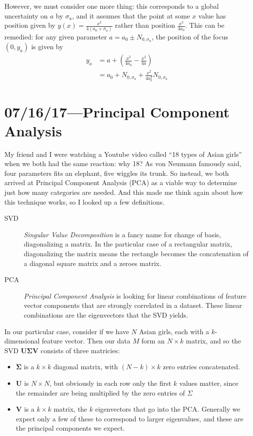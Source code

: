 \documentclass[12pt]{report}
\newcommand{\bm}[1]{\boldsymbol{\mathbf{#1}}}
\begin{document}
However, we must consider one more thing: this corresponds to a global
uncertainty on $a$ by $\sigma_a$, and it assumes that the point at some $x$
value has position given by $y(x) = \frac{x^2}{4 (a_0 + \sigma_a)}$ rather than
position $\frac{x^2}{4 a_0}$. This can be remedied: for any given parameter $a =
a_0 \pm N_{0, \sigma_a}$, the position of the focus $(0, y_a)$ is given by
\begin{align*}
    y_a
        &= a + \left(\frac{x^2}{4a_0} - \frac{x^2}{4 a}\right)\\
        &= a_0 + N_{0, \sigma_a} + \frac{x^2}{4a_0^2}N_{0, \sigma_a}
\end{align*}

\chapter{07/16/17---Principal Component Analysis}

My friend and I were watching a Youtube video called ``18 types of Asian girls''
when we both had the same reaction: why 18? As von Neumann famously said, four
parameters fits an elephant, five wiggles its trunk. So instead, we both arrived
at Principal Component Analysis (PCA) as a viable way to determine just how many
categories are needed. And this made me think again about how this technique
works, so I looked up a few definitions.

\begin{description}
    \item[SVD] \emph{Singular Value Decomposition} is a fancy name for
        change of basis, diagonalizing a matrix. In the particular case of a
        rectangular matrix, diagonalizing the matrix means the rectangle becomes
        the concatenation of a diagonal square matrix and a zeroes matrix.

    \item[PCA] \emph{Principal Component Analysis} is looking for linear
        combinations of feature vector components that are strongly correlated
        in a dataset. These linear combinations are the eigenvectors that the
        SVD yields.
\end{description}

In our particular case, consider if we have $N$ Asian girls, each with a
$k$-dimensional feature vector. Then our data $M$ form an $N \times k$ matrix, and
so the SVD $\bm{U\Sigma V}$ consists of three matricies:
\begin{itemize}
    \item $\bm{\Sigma}$ is a $k \times k$ diagonal matrix, with $(N - k) \times
        k$ zero entries concatenated.
    \item $\bm{U}$ is $N \times N$, but obviously in each row only the first $k$
        values matter, since the remainder are being multiplied by the zero
        entries of $\Sigma$
    \item $\bm{V}$ is a $k \times k$ matrix, the $k$ eigenvectors that go into
        the PCA\@. Generally we expect only a few of these to correspond to larger
        eigenvalues, and these are the principal components we expect.
\end{itemize}
\end{document}
